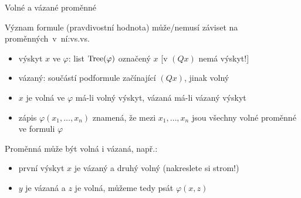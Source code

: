 \documentclass{beamer}
\begin{document}
\begin{frame}{Volné a vázané proměnné}

    Význam formule (\alert{pravdivostní hodnota}) může/nemusí záviset na proměnných~v~ní:vs.vs.

    \begin{itemize}
        \item \alert{výskyt $x$ ve $\varphi$:} list $\operatorname{Tree}(\varphi)$ označený $x$ [v $(Qx)$ nemá výskyt!]
        \item \alert{vázaný}: součástí podformule začínající $(Qx)$, jinak \alert{volný}
        \item $x$ je \alert{volná} ve $\varphi$ má-li volný výskyt, \alert{vázaná} má-li vázaný výskyt
        \item zápis \alert{$\varphi(x_1,\dots,x_n)$} znamená, že mezi $x_1,\dots,x_n$ jsou všechny volné proměnné ve formuli $\varphi$
    \end{itemize}

    Proměnná může být \alert{volná i vázaná}, např.:

    \begin{itemize}
        \item první výskyt $x$ je vázaný a druhý volný (nakreslete si strom!) 
        \item $y$ je vázaná a $z$ je volná, můžeme tedy psát $\varphi(x,z)$
    \end{itemize}

\end{frame}
\end{document}
